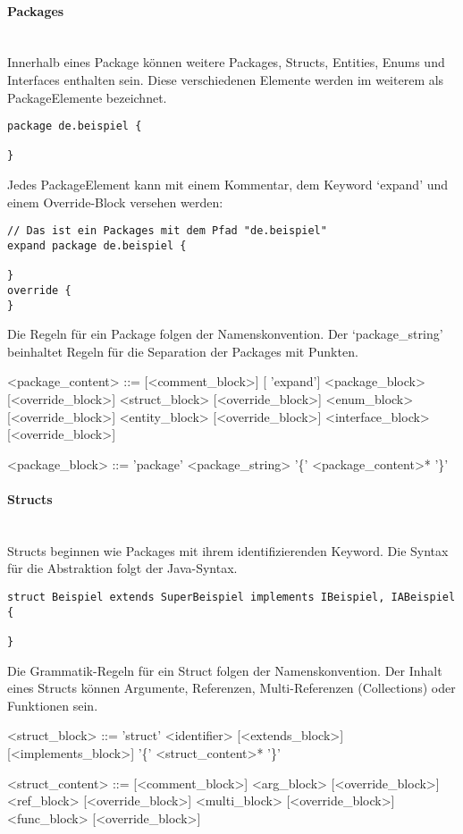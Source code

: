 \documentclass[./einleitung.tex]{subfiles}
\begin{document}
\paragraph{Packages}\mbox{}\\
Innerhalb eines Package können weitere Packages, Structs, Entities, Enums und Interfaces enthalten sein.
Diese verschiedenen Elemente werden im weiterem als PackageElemente bezeichnet.\\
\begin{lstlisting}
package de.beispiel {

}
\end{lstlisting}
Jedes PackageElement kann mit einem Kommentar, dem Keyword `expand' und einem Override-Block versehen werden:
\begin{lstlisting}
// Das ist ein Packages mit dem Pfad "de.beispiel"
expand package de.beispiel {

}
override {
}
\end{lstlisting}

Die Regeln für ein Package folgen der Namenskonvention.
Der `package_string' beinhaltet Regeln für die Separation der Packages mit Punkten.
\begin{grammar}
<package_content> ::= [<comment_block>] [ 'expand'] <package_block> [<override_block>]
 <struct_block> [<override_block>]
 <enum_block> [<override_block>]
 <entity_block> [<override_block>]
 <interface_block> [<override_block>]

<package_block> ::= 'package' <package_string> '\{' <package_content>* '\}'
\end{grammar}

\paragraph{Structs} \mbox{}\\
Structs beginnen wie Packages mit ihrem identifizierenden Keyword.
Die Syntax für die Abstraktion folgt der Java-Syntax.
\begin{lstlisting}
struct Beispiel extends SuperBeispiel implements IBeispiel, IABeispiel {

}
\end{lstlisting}

Die Grammatik-Regeln für ein Struct folgen der Namenskonvention.
Der Inhalt eines Structs können Argumente, Referenzen, Multi-Referenzen (Collections) oder Funktionen sein.
\begin{grammar}
<struct_block> ::= 'struct' <identifier> [<extends_block>] [<implements_block>] '\{' <struct_content>* '\}'

<struct_content> ::= [<comment_block>] <arg_block> [<override_block>]
 <ref_block> [<override_block>]
 <multi_block> [<override_block>]
 <func_block> [<override_block>]

\end{grammar}
\end{document}
